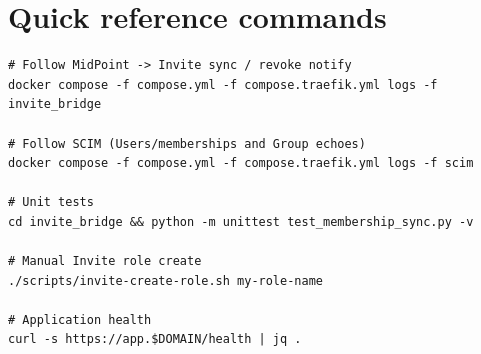 \documentclass[11pt,a4paper]{article}
\begin{document}
\appendix
\section{Quick reference commands}

\begin{lstlisting}
# Follow MidPoint -> Invite sync / revoke notify
docker compose -f compose.yml -f compose.traefik.yml logs -f invite_bridge

# Follow SCIM (Users/memberships and Group echoes)
docker compose -f compose.yml -f compose.traefik.yml logs -f scim

# Unit tests
cd invite_bridge && python -m unittest test_membership_sync.py -v

# Manual Invite role create
./scripts/invite-create-role.sh my-role-name

# Application health
curl -s https://app.$DOMAIN/health | jq .
\end{lstlisting}
\end{document}
